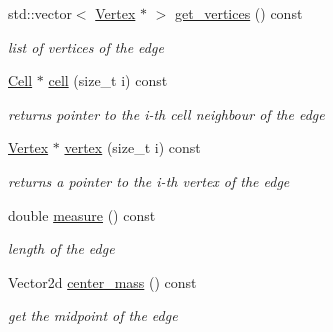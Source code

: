 \begin{DoxyCompactItemize}
\mbox{\label{classHArDCore2D_1_1Edge_a5315c7fa0058509166d75175660ed542}} 
std\+::vector$<$ \hyperlink{classHArDCore2D_1_1Vertex}{Vertex} $\ast$ $>$ \hyperlink{classHArDCore2D_1_1Edge_a5315c7fa0058509166d75175660ed542}{get\+\_\+vertices} () const
\begin{DoxyCompactList}\small\item\em list of vertices of the edge \end{DoxyCompactList}\item 
\mbox{\label{classHArDCore2D_1_1Edge_ad4be0bfb981ccf2c1e02e870772dbdc3}} 
\hyperlink{classHArDCore2D_1_1Cell}{Cell} $\ast$ \hyperlink{classHArDCore2D_1_1Edge_ad4be0bfb981ccf2c1e02e870772dbdc3}{cell} (size\+\_\+t i) const
\begin{DoxyCompactList}\small\item\em returns pointer to the i-\/th cell neighbour of the edge \end{DoxyCompactList}\item 
\mbox{\label{classHArDCore2D_1_1Edge_ade257bc049ec1f43751fc647e07ec052}} 
\hyperlink{classHArDCore2D_1_1Vertex}{Vertex} $\ast$ \hyperlink{classHArDCore2D_1_1Edge_ade257bc049ec1f43751fc647e07ec052}{vertex} (size\+\_\+t i) const
\begin{DoxyCompactList}\small\item\em returns a pointer to the i-\/th vertex of the edge \end{DoxyCompactList}\item 
\mbox{\label{classHArDCore2D_1_1Edge_a6c00cbb57ddc2e80e3c07849eadc68a8}} 
double \hyperlink{classHArDCore2D_1_1Edge_a6c00cbb57ddc2e80e3c07849eadc68a8}{measure} () const
\begin{DoxyCompactList}\small\item\em length of the edge \end{DoxyCompactList}\item 
\mbox{\label{classHArDCore2D_1_1Edge_a0f5647010760274bb83adee19091eeb5}} 
Vector2d \hyperlink{classHArDCore2D_1_1Edge_a0f5647010760274bb83adee19091eeb5}{center\+\_\+mass} () const
\begin{DoxyCompactList}\small\item\em get the midpoint of the edge \end{DoxyCompactList}\item 

\end{DoxyCompactItemize}
